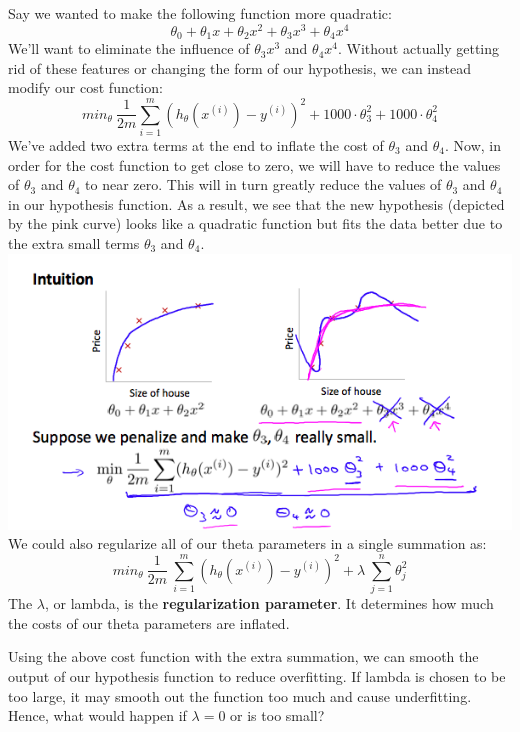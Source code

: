 \documentclass{article}
\begin{document}
Say we wanted to make the following function more quadratic:
$$\theta_0 + \theta_1x + \theta_2x^2 + \theta_3x^3 + \theta_4x^4$$
We'll want to eliminate the influence of $\theta_3x^3$ and $\theta_4x^4$. Without actually getting rid of these features or changing the form of our hypothesis, we can instead modify our cost function:
$$min_\theta\ \dfrac{1}{2m}\sum_{i=1}^m (h_\theta(x^{(i)}) - y^{(i)})^2 + 1000\cdot\theta_3^2 + 1000\cdot\theta_4^2$$
We've added two extra terms at the end to inflate the cost of $\theta_3$ and $\theta_4$. Now, in order for the cost function to get close to zero, we will have to reduce the values of $\theta_3$ and $\theta_4$ to near zero. This will in turn greatly reduce the values of $\theta_3$ and $\theta_4$ in our hypothesis function. As a result, we see that the new hypothesis (depicted by the pink curve) looks like a quadratic function but fits the data better due to the extra small terms $\theta_3$ and $\theta_4$.\\
\includegraphics[width=\textwidth]{Modify-Cost-Function.png}
We could also regularize all of our theta parameters in a single summation as:
$$min_\theta\ \dfrac{1}{2m}\  \sum_{i=1}^m (h_\theta(x^{(i)}) - y^{(i)})^2 + \lambda\ \sum_{j=1}^n \theta_j^2$$
The $\lambda$, or lambda, is the \textbf{regularization parameter}. It determines how much the costs of our theta parameters are inflated.

Using the above cost function with the extra summation, we can smooth the output of our hypothesis function to reduce overfitting. If lambda is chosen to be too large, it may smooth out the function too much and cause underfitting. Hence, what would happen if $\lambda = 0$ or is too small?
\end{document}
